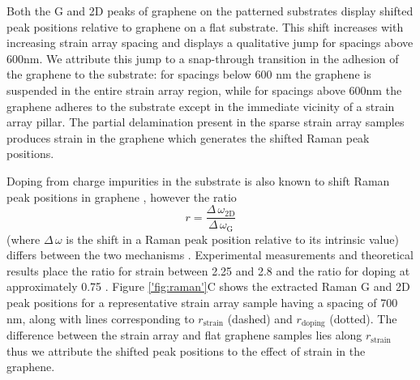 \documentclass[edeposit,fullpage,draftthesis]{uiucthesis2009}
\begin{document}
           
            Both the G and 2D peaks of graphene on the patterned 
            substrates display shifted peak positions relative to graphene on a flat substrate. 
            This shift increases with increasing strain array spacing and displays a qualitative jump
            for spacings above 600nm. We attribute this jump to a 
            snap-through transition\cite{gill2015mechanical, scharfenberg2012observation}
            in the adhesion of the graphene to the substrate: for spacings below 600 nm the graphene is suspended
            in the entire strain array region, while for spacings above 600nm the graphene adheres to the substrate
            except in the immediate vicinity of a strain array pillar. The partial delamination
            present in the sparse strain array samples
            produces strain in the graphene which generates the shifted Raman peak positions.
            
            
            Doping from charge impurities in the substrate is also known to 
            shift Raman peak positions in graphene \cite{reina2008large, casiraghi2007raman}, however the ratio 
            \begin{equation}
                r = \frac{\Delta \, \omega_\text{2D}}{\Delta \, \omega_\text{G}}
            \end{equation}
            (where $\Delta \, \omega$ is the shift in a Raman peak position relative to its intrinsic value)
            differs between the two mechanisms \cite{lee2012optical}. 
            Experimental measurements \cite{zabel2012raman, metzger2009biaxial, ding2010stretchable} 
            and theoretical results \cite{mohr2010splitting, mohiuddin2009uniaxial} place the ratio for strain 
            between 2.25 and 2.8 and the ratio for doping at approximately 0.75 \cite{lee2012optical}. 
            Figure \ref{'fig:raman'}C shows the extracted Raman G and 2D peak positions for a representative
            strain array sample having a spacing of 700 nm,
            along with lines corresponding to $r_\text{strain}$ (dashed) and $r_\text{doping}$ (dotted). 
            The difference between the strain array and flat graphene samples lies along $r_\text{strain}$ thus we
            attribute the shifted peak positions to the effect of strain in the graphene.
            
\end{document}
